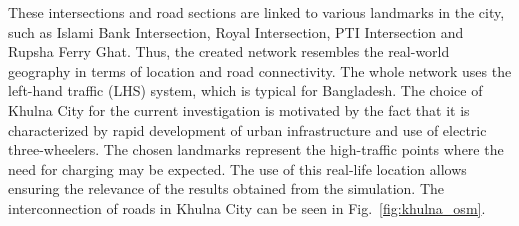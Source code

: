 \documentclass{thesis-library}
\begin{document}
\begin{table}[H]
\caption{Microscopic Road Network Configuration and Edge Parameters.}
\label{tab:road_network}
\begin{center}
\begin{small}
\end{small}

\end{center}
\end{table}

These intersections and road sections are linked to various landmarks in the city, such as Islami Bank Intersection, Royal Intersection, PTI Intersection and Rupsha Ferry Ghat. Thus, the created network resembles the real-world geography in terms of location and road connectivity. The whole network uses the left-hand traffic (LHS) system, which is typical for Bangladesh. The choice of Khulna City for the current investigation is motivated by the fact that it is characterized by rapid development of urban infrastructure and use of electric three-wheelers. The chosen landmarks represent the high-traffic points where the need for charging may be expected. The use of this real-life location allows ensuring the relevance of the results obtained from the simulation. The interconnection of roads in Khulna City can be seen in Fig.~\ref{fig:khulna_osm}.
\end{document}
